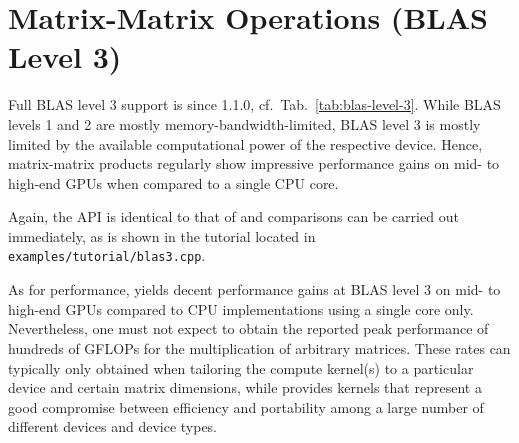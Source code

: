 \section{Matrix-Matrix Operations (BLAS Level 3)}
Full BLAS level 3 support is since {\ViennaCL} 1.1.0, cf.~Tab.~\ref{tab:blas-level-3}. While BLAS
levels 1 and 2 are mostly memory-bandwidth-limited, BLAS level 3 is mostly
limited by the available computational power of the respective device. Hence,
matrix-matrix products regularly show impressive performance gains on mid-
to high-end GPUs when compared to a single CPU core.

Again, the {\ViennaCL} API is identical to that of {\ublas} and comparisons can
be carried out immediately, as is shown in the tutorial located in
\texttt{examples/tutorial/blas3.cpp}.

As for performance, {\ViennaCL} yields decent performance gains at BLAS level
3 on mid- to high-end GPUs compared to CPU implementations using a single core
only. Nevertheless, one must not expect to obtain the reported peak performance
of hundreds of GFLOPs for the multiplication of arbitrary matrices. These rates
can typically only obtained when tailoring the compute kernel(s) to a
particular device and certain matrix dimensions, while {\ViennaCL} provides
kernels that represent a good compromise between efficiency and portability
among a large number of different devices and device types.

